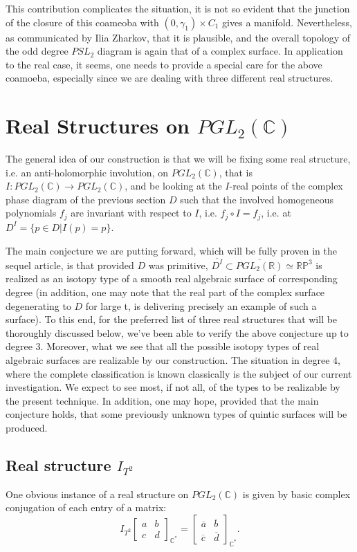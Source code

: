 \documentclass[pdflatex,sn-mathphys-num]{sn-jnl}%
\theoremstyle{thmstyleone}%
\theoremstyle{thmstyletwo}%
\theoremstyle{thmstylethree}%
\newcommand{\R}{\mathbb{R}}
\newcommand{\RP}{\mathbb{R}\mathbb{P}}
\newcommand{\C}{\mathbb{C}}
\begin{document}
This contribution complicates the situation, it is not so evident that the junction of the closure of this coameoba with $(0, \gamma_1) \times C_1$ gives a manifold. Nevertheless, 
as communicated by Ilia Zharkov, that it is plausible, and the overall topology of the odd degree $PSL_2$ diagram is again that of a complex surface. In application to the real case, it seems, one needs to provide a special care for the above coamoeba, especially since we are dealing with three different real structures.

\section{Real Structures on $PGL_2(\C)$}
The general idea of our construction is that we will be fixing some real structure, i.e. an anti-holomorphic involution, on $PGL_2(\C)$, that is $I: PGL_2(\C) \longrightarrow PGL_2(\C)$, and be looking at the $I$-real points of the complex phase diagram of the previous section $D$ such that the involved homogeneous polynomials $f_j$ are invariant with respect to $I$, i.e. $f_j\circ I=f_j$, i.e. at $D^I=\{p\in D|  I(p)=p\}$.

The main conjecture we are putting forward, which will be fully proven in the sequel article, is that provided $D$ was primitive, $\overline{D^I}\subset\overline{PGL_2(\R)}\simeq \RP^3$ is realized as an isotopy type of a smooth real algebraic surface of corresponding degree (in addition, one may note that the real part of the complex surface degenerating to $D$ for large t, is delivering precisely an example of such a surface). To this end, for the preferred list of three real structures that will be thoroughly discussed below, we've been able to verify the above conjecture up to degree $3$. Moreover, what we see that all the possible isotopy types of real algebraic surfaces are realizable by our construction. The situation in degree $4$, where the complete classification
is known classically is the subject of our current investigation. We expect to see most, if not all, of the types to be realizable by the present technique. In addition, one may hope, provided that the main conjecture holds, that some previously
unknown types of quintic surfaces will be produced.


\subsection{Real structure $I_{T^2}$}
One obvious instance of a real structure on $PGL_2(\C)$ is given by basic complex conjugation of each entry of a matrix:
$$I_{T^2}\begin{bmatrix}
	a & b\\
	c & d
\end{bmatrix}_{\C^*}=
\begin{bmatrix}
	\overline{a} & \overline{b}\\
	\overline{c}& \overline{d}
\end{bmatrix}_{\C^*}.$$
\end{document}
